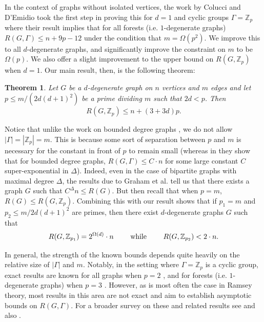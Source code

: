 \documentclass{article}
\newcommand\ZZ{{\mathbb Z}}
\newtheorem{theorem}{Theorem}[section]
\theoremstyle{definition}
\begin{document}
In the context of graphs without isolated vertices, the work by Colucci and D'Emidio \cite{CD25} took the first step in proving this for $d=1$ and cyclic groups $\Gamma=\mathbb{Z}_p$ where their result implies that for all forests (i.e. $1$-degenerate graphs) $R(G,\Gamma) \leq n + 9p-12$ under the condition that $m=\Omega(p^2)$. We improve this to all $d$-degenerate graphs, and significantly improve the constraint on $m$ to be $\Omega(p)$. We also offer a slight improvement to the upper bound on $R(G,\mathbb{Z}_p)$ when $d=1$. Our main result, then, is the following theorem:

\begin{theorem}\label{mainT}
Let $G$ be a $d$-degenerate graph on $n$ vertices and $m$ edges and let $p\leq m/(2d(d+1)^2)$ be a prime dividing $m$ such that $2d<p$. Then $$R(G,\mathbb{Z}_p)\leq n+(3+3d)p.$$
\end{theorem}

Notice that unlike the work on bounded degree graphs \cite{bounded_degree}, we do not allow $|\Gamma|=|\mathbb{Z}_p|=m$. This is because some sort of separation between $p$ and $m$ is necessary for the constant in front of $p$ to remain small (whereas in \cite{bounded_degree} they show that for bounded degree graphs, $R(G,\Gamma)\leq C\cdot n$ for some large constant $C$ super-exponential in $\Delta$). Indeed, even in the case of bipartite graphs with maximal degree $\Delta$, the results due to Graham et al. \cite{GRRR01} tell us that there exists a graph $G$ such that $ C^\Delta n\leq R(G)$. But then recall that when $p=m$, $R(G)\leq R(G,\mathbb{Z}_p)$.
Combining this with our result shows that if $p_1=m$ and $p_2\leq m/2d(d+1)^2$ are primes, then there exist $d$-degenerate graphs $G$ such that  $$R(G,\mathbb{Z}_{p_1})=2^{\Omega(d)}\cdot n \text{ \quad \quad while \quad \quad }R(G,\mathbb{Z}_{p_2})< 2\cdot n.$$

In general, the strength of the known bounds depends quite heavily on the relative size of $|\Gamma|$ and $m$. Notably, in the setting where $\Gamma=\ZZ_p$ is a cyclic group, exact results are known for all graphs when $p =2$ \cite{Caro94}, and for forests (i.e. $1$-degenerate graphs) when $p=3$ \cite{ADP25}. However, as is most often the case in Ramsey theory, most results in this area are not exact and aim to establish asymptotic bounds on $R(G,\Gamma)$. For a broader survey on these and related results see \cite{Carosurvey} and also \cite{CD25, Caro92, AC93, bounded_degree}.
\end{document}
